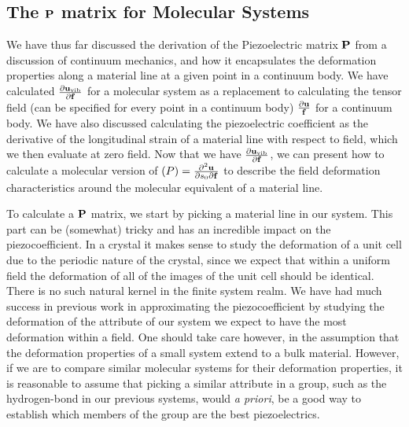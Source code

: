 \subsection{The ${\bf{P}}$ matrix for Molecular Systems}
We have thus far discussed the derivation of the Piezoelectric matrix ${\bf{P}}$ from a discussion of continuum mechanics, and how it encapsulates
the deformation properties along a material line at a given point in a continuum body. 
We have calculated $ {\frac{\partial {\ensuremath{\bf{u}}}_{\mathrm{vib}}}{\partial {\ensuremath{\bf{f}}}}}$ for a molecular system as a replacement to calculating the tensor field (can be specified for every point in a 
continuum body) $\frac{\partial {\mathbf u}}{{\mathbf f}}$ for a continuum body.
We have also discussed calculating the piezoelectric coefficient as the derivative of the longitudinal strain of a material line with respect to field, which we then evaluate
at zero field. 
Now that we have $ {\frac{\partial {\ensuremath{\bf{u}}}_{\mathrm{vib}}}{\partial {\ensuremath{\bf{f}}}}}$, we can present how to calculate a molecular version of ${\mathbf (}P)=\frac{\partial^2{\mathbf u}}{\partial s_0 \partial {\mathbf f}}$
to describe the field deformation characteristics around the molecular equivalent of a material line. 

To calculate a ${\bf{P}}$ matrix, we start by picking a material line in our system.  
This part can be (somewhat) tricky and has an incredible impact on the piezocoefficient.  
In a crystal it makes sense to study the
deformation of a unit cell due to the periodic nature of the crystal, since we expect that within a uniform field the deformation of all of the 
images of the unit cell should be identical.
There is no such natural kernel in the finite system realm.  
We have had much success in previous work in approximating the piezocoefficient by studying the deformation of the attribute of our
system we expect to have the most deformation within a field. 
One should take care however, in the assumption that the deformation properties of a small system extend to a bulk material.
However, if we are to compare similar molecular systems for their deformation properties,
it is reasonable to assume that picking a similar attribute in a group, such as the hydrogen-bond in our previous systems, would \textit{a priori}, be a good way to establish which members of
the group are the best piezoelectrics.

